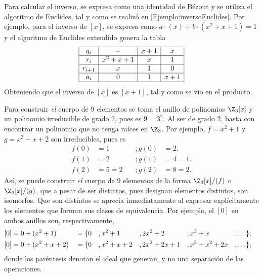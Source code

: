 \begin{ejs}
        Para calcular el inverso, se expresa como una identidad de Bézout y se utiliza el algoritmo de Euclides, tal y como se realizó en \ref{Ejemplo:inversoEuclides}. Por ejemplo, para el inverso de $[x]$, se expresa como $a\cdot(x) + b\cdot(x^2+x+1) = 1$ y el algoritmo de Euclides extendido genera la tabla
         \[
                \begin{array}{|c|c|c|c|}
                    \hline
                    q_i     &  -          & x + 1     & x \\
                    \hline
                    r_i    &  x^2 + x + 1 & x & 1  \\
                    \hline
                    r_{i+1} &  x & 1           &  0        \\
                    \hline
                    a_i     &0            &  1          &  x + 1       \\
                    \hline
                \end{array}
        \]        
        Obteniendo que el inverso de $[x]$ es $[x+1]$, tal y como se vio en el producto.

        
        \item Para construir \textit{el} cuerpo de 9 elementos se toma el anillo de polinomios $\Z_3[x]$ y un polinomio irreducible de grado 2, pues es $9 = 3^2$. Al ser de grado 2, basta con encontrar un polinomio que no tenga raíces en $\Z_3$. Por ejemplo, $f = x^2 + 1$ y $g = x^2 + x + 2$ son irreducibles, pues es
        \begin{equation*}
            \begin{aligned}
                f(0) &= 1 \quad     &; g(0) &= 2.\\
                f(1) &= 2 \quad     &; g(1) &= 4 = 1.\\
                f(2) &= 5 =2 \quad  &; g(2) &= 8 = 2.
            \end{aligned}
        \end{equation*}
        Así, se puede construir \textit{el} cuerpo de 9 elementos de la forma $\Z_3[x]/(f)$ o $\Z_3[x]/(g)$, que a pesar de ser distintos, pues designan elementos distintos, son isomorfos. Que son distintos se aprecia inmediatamente al expresar explícitamente los elementos que forman sus clases de equivalencia. Por ejemplo, el $[0]$ en ambos anillos son, respectivamente,
            \begin{equation*}
                \begin{aligned}\relax 
                    [0] &= 0 + (x^2 + 1) &&= \{0&&,x^2 + 1&&, 2x^2 + 2&&, x^3 + x&&, \ldots \};&&\\
                    [0] &= 0 + (x^2 + x +  2)&&= \{0&&,x^2 + x +  2&&, 2x^2 + 2x + 1&&, x^3 + x^2 + 2x&&, \ldots\};&&
                \end{aligned}
            \end{equation*}
        donde los paréntesis denotan el ideal que generan, y no una separación de las operaciones.
    

\end{ejs}
